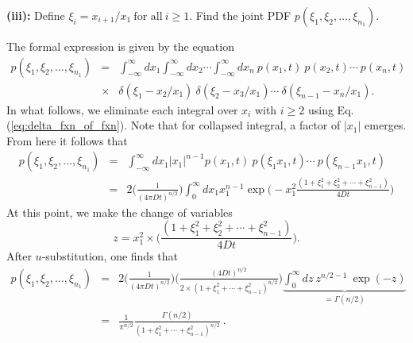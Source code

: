 \textbf{(iii):} Define $\xi_i = x_{i+1}/x_1~\text{for all}~i\geq 1$. Find the joint PDF $p(\xi_1, \xi_2, \ldots, \xi_{n_1})$.

The formal expression is given by the equation
\begin{eqnarray}
p(\xi_1, \xi_2, \ldots, \xi_{n_1}) &=& \int_{-\infty}^{\infty} dx_1 \int_{-\infty}^{\infty} dx_2 \cdots \int_{-\infty}^{\infty} dx_n~p(x_1, t)~p(x_2, t) \cdots ~ p(x_n, t) \nonumber \\
&\times&  \delta(\xi_1 - x_2/x_1)~\delta(\xi_2 - x_3/x_1)\cdots ~\delta(\xi_{n-1} - x_n/x_1).
\end{eqnarray}
In what follows, we eliminate each integral over $x_i$ with $i\geq 2$ using Eq. (\ref{eq:delta_fxn_of_fxn}). Note that for collapsed integral, a factor of $|x_1|$ emerges. From here it follows that
\begin{eqnarray}
p(\xi_1, \xi_2, \ldots, \xi_{n_1}) &=& \int_{-\infty}^{\infty} dx_1 |x_1|^{n-1} p(x_1, t)~p(\xi_1 x_1, t) \cdots ~ p(\xi_{n-1} x_1, t) \nonumber \\
&=& 2 \bigg(\frac{1}{(4 \pi D t)^{n/2}}\bigg) \int_{0}^{\infty} dx_1 x_1^{n-1} \exp\bigg( -x_1^2 \frac{(1+\xi_1^2 + \xi_2^2 + \cdots + \xi_{n-1}^2)}{4Dt}\bigg) \nonumber
\end{eqnarray}
At this point, we make the change of variables
\begin{equation}
z = x_1^2 \times \bigg(\frac{(1+\xi_1^2 + \xi_2^2 + \cdots + \xi_{n-1}^2)}{4Dt}\bigg).
\end{equation}
After $u$-substitution, one finds that
\begin{eqnarray}
p(\xi_1, \xi_2, \ldots, \xi_{n_1}) &=& 2 \bigg(\frac{1}{(4 \pi D t)^{n/2}} \bigg) \bigg( \frac{(4 D t)^{n/2}}{2\times(1+\xi_1^2 +\cdots + \xi_{n-1}^2)^{n/2}} \bigg) \underbrace{\int_{0}^{\infty} dz~z^{n/2-1}~\exp(-z)}_{=\Gamma(n/2)} \nonumber \\
&=&  \boxed{\frac{1}{\pi^{n/2}} \frac{\Gamma(n/2)}{(1+\xi_1^2 +\cdots + \xi_{n-1}^2)^{n/2}}}~.  \nonumber
\end{eqnarray}